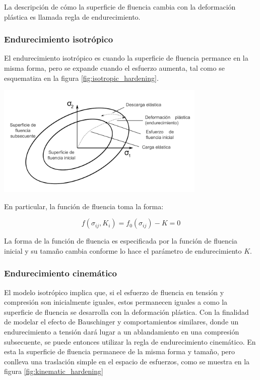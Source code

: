 La descripción de cómo la superficie de fluencia cambia con la deformación plástica es 
llamada regla de endurecimiento. 

\subsubsection{Endurecimiento isotrópico}

El endurecimiento isotrópico es cuando la superficie de fluencia permance en la misma forma, 
pero se expande cuando el esfuerzo aumenta, tal como se esquematiza en la figura \ref{fig:isotropic_hardening}.

\begin{center}
\includegraphics[width=0.75\textwidth]{src/ch2/isotropic_hardening}
\label{fig:isotropic_hardening}
\end{center}

En particular, la función de fluencia toma la forma:

\begin{equation}
f(\sigma_{ij}, K_i) = f_0 ( \sigma_{ij} ) - K = 0
\end{equation}

La forma de la función de fluencia es especificada por la función de fluencia inicial y su 
tamaño cambia conforme lo hace el parámetro de endurecimiento $K$.


\subsubsection{Endurecimiento cinemático}

El modelo isotrópico implica que, si el esfuerzo de fluencia en tensión y compresión son 
inicialmente iguales, estos permanecen iguales a como la superficie de fluencia se desarrolla 
con la deformación plástica. Con la finalidad de modelar el efecto de Bauschinger y comportamientos 
similares, donde un endurecimiento a tensión dará lugar a un ablandamiento en una compresión 
subsecuente, se puede entonces utilizar la regla de endurecimiento cinemático. En esta 
la superficie de fluencia permanece de la misma forma y tamaño, pero conlleva una traslación simple 
en el espacio de esfuerzos, como se muestra en la figura \ref{fig:kinematic_hardening}


